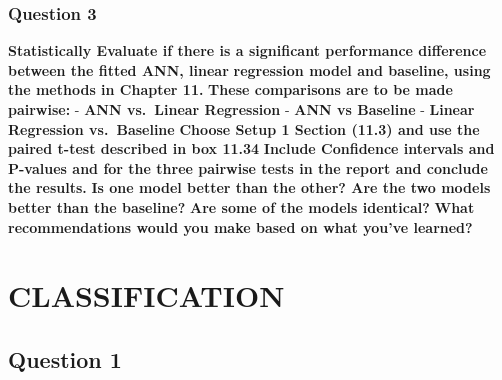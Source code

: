 \documentclass[
]{article}
\begin{document}
\hypertarget{question-3-1}{%
\subsubsection{Question 3}\label{question-3-1}}

\textbf{Statistically Evaluate if there is a significant performance
difference between the fitted ANN, linear } \textbf{regression model and
baseline, using the methods in Chapter 11.} \textbf{These comparisons
are to be made pairwise:} - \textbf{ANN vs.~Linear Regression} -
\textbf{ANN vs Baseline} - \textbf{Linear Regression vs.~Baseline}
\textbf{Choose Setup 1 Section (11.3) and use the paired t-test
described in box 11.34} \textbf{Include Confidence intervals and
P-values and for the three pairwise tests in the report and conclude the
results. } \textbf{Is one model better than the other? Are the two
models better than the baseline?} \textbf{Are some of the models
identical? } \textbf{What recommendations would you make based on what
you've learned? }

\newpage

\hypertarget{classification}{%
\section{CLASSIFICATION}\label{classification}}

\hypertarget{question-1-2}{%
\subsection{Question 1}\label{question-1-2}}
\end{document}
